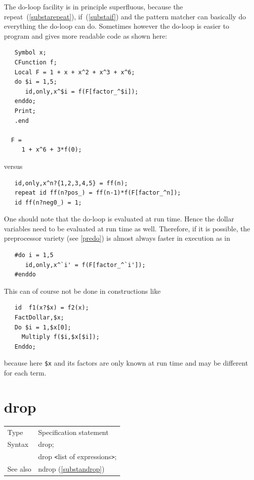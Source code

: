 \noindent The do-loop facility is in principle superfluous, because the 
repeat~(\ref{substarepeat}), if~(\ref{substaif}) and the pattern matcher can 
basically do everything the do-loop can do. Sometimes however the do-loop 
is easier to program and gives more readable code as shown here:
\begin{verbatim}
   Symbol x;
   CFunction f;
   Local F = 1 + x + x^2 + x^3 + x^6;
   do $i = 1,5;
      id,only,x^$i = f(F[factor_^$i]);
   enddo;
   Print;
   .end

  F =
     1 + x^6 + 3*f(0);
\end{verbatim}
\noindent versus
\begin{verbatim}
   id,only,x^n?{1,2,3,4,5} = ff(n);
   repeat id ff(n?pos_) = ff(n-1)*f(F[factor_^n]);
   id ff(n?neg0_) = 1;
\end{verbatim}
\noindent One should note that the do-loop is evaluated at run time. Hence 
the dollar variables need to be evaluated at run time as well. Therefore, 
if it is possible, the preprocessor variety (see \ref{predo}) is almost 
always faster in execution as in
\begin{verbatim}
   #do i = 1,5
      id,only,x^`i' = f(F[factor_^`i']);
   #enddo
\end{verbatim}
\noindent This can of course not be done in constructions like
\begin{verbatim}
   id  f1(x?$x) = f2(x);
   FactDollar,$x;
   Do $i = 1,$x[0];
     Multiply f($i,$x[$i]);
   Enddo;
\end{verbatim}
\noindent because here \verb:$x: and its factors are only known at run time 
and may be different for each term.
\vspace{10mm}


\section{drop}
\label{substadrop}

\noindent \begin{tabular}{ll}
Type & Specification statement\\
Syntax & drop; \\
       & drop {\tt<}list of expressions{\tt>};
\\ See also & ndrop (\ref{substandrop})
\end{tabular} \vspace{4mm}

